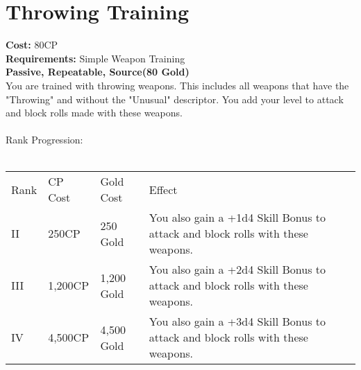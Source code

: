 \section{Throwing Training}\label{perk:throwingTraining}
\textbf{Cost:} 80CP\\
\textbf{Requirements:} Simple Weapon Training\\
\textbf{Passive, Repeatable, Source(80 Gold)}\\
You are trained with throwing weapons.
This includes all weapons that have the "Throwing" and without the "Unusual" descriptor.
You add your level to attack and block rolls made with these weapons.\\
\\
Rank Progression:\\
\\
\begin{longtable}{l | l | l | p{9cm}}
	Rank & CP Cost & Gold Cost & Effect\\
	II & 250CP & 250 Gold & You also gain a +1d4 Skill Bonus to attack and block rolls with these weapons.\\
	III & 1,200CP & 1,200 Gold & You also gain a +2d4 Skill Bonus to attack and block rolls with these weapons.\\
	IV & 4,500CP & 4,500 Gold & You also gain a +3d4 Skill Bonus to attack and block rolls with these weapons.\\
\end{longtable}
